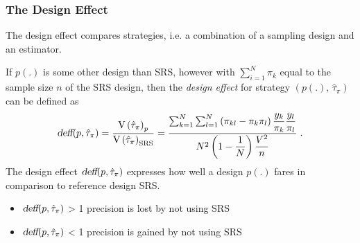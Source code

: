 \documentclass[10pt]{beamer}\usepackage[]{graphicx}\usepackage[]{color}
\newcommand{\V}[1]{\text{V}\left(#1\right)}
\newcommand{\deff}{\ensuremath{\text{\slshape deff}}}
\begin{document}
\begin{frame}\frametitle{The Design Effect}
 The design effect compares strategies, i.e. a combination of a sampling design and an estimator.

	If $p(.)$ is some other design than SRS, however with $\sum_{i=1}^N \pi_k$ equal to the sample size $n$ of the SRS design, then the \emph{design effect} for strategy $(p(.) ,\, \hat{\tau}_{\pi})$ can be defined as
	 $$ \deff(p, \hat{\tau}_{\pi}) = \dfrac{\V{\hat{\tau}_{\pi}}_p}{\V{ \hat{\tau}_{\pi}}_{\text{SRS}}} = 
	  \dfrac{\sum_{k=1}^N \sum_{l=1}^N  \left(\pi_{kl}  - \pi_k \pi_l \right) \dfrac{y_k}{\pi_k}\dfrac{y_l}{\pi_l}}{N^2 \left( 1 - \dfrac{1}{N} \right) \dfrac{V^2}{n} }\;{.} 
	 $$
	The design effect $\deff(p, \hat{\tau}_{\pi})$ expresses how well a design $p(.)$ fares in comparison to reference design SRS.

	\begin{itemize}
		\item $\deff(p, \hat{\tau}_{\pi})$  > 1 precision is lost by not using SRS
		\item $\deff(p, \hat{\tau}_{\pi})$  < 1 precision is gained by not using SRS
	\end{itemize}

\end{frame}
\end{document}
